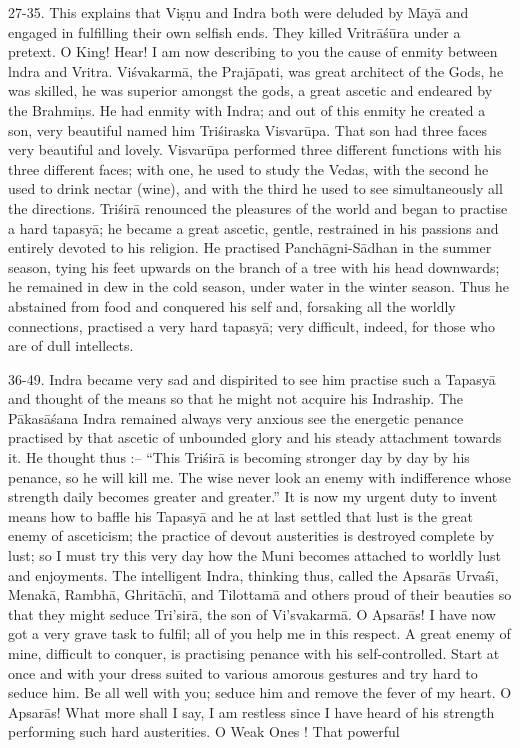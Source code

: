 27-35. This explains that Vi\d{s}\d{n}u and Indra both were deluded by M\=ay\=a and engaged in fulfilling their own selfish ends. They killed Vritr\=a\'s\=ura under a pretext. O King! Hear! I am now describing to you the cause of enmity between lndra and Vritra. Vi\'svakarm\=a, the Praj\=apati, was great architect of the Gods, he was skilled, he was superior amongst the gods, a great ascetic and endeared by the Brahmi\d{n}s. He had enmity with Indra; and out of this enmity he created a son, very beautiful named him Tri\'siraska Visvar\=upa. That son had three faces very beautiful and lovely. Visvar\=upa performed three different functions with his three different faces; with one, he used to study the Vedas, with the second he used to drink nectar (wine), and with the third he used to see simultaneously all the directions. Tri\'sir\=a renounced the pleasures of the world and began to practise a hard tapasy\=a; he became a great ascetic, gentle, restrained in his passions and entirely devoted to his religion. He practised Panch\=agni-S\=adhan in the summer season, tying his feet upwards on the branch of a tree with his head downwards; he remained in dew in the cold season, under water in the winter season. Thus he abstained from food and conquered his self and, forsaking all the worldly connections, practised a very hard tapasy\=a; very difficult, indeed, for those who are of dull intellects.

36-49. Indra became very sad and dispirited to see him practise such a Tapasy\=a and thought of the means so that he might not acquire his Indraship. The P\=akas\=a\'sana Indra remained always very anxious see the energetic penance practised by that ascetic of unbounded glory and his steady attachment towards it. He thought thus :-- ``This Tri\'sir\=a is becoming stronger day by day by his penance, so he will kill me. The wise never look an enemy with indifference whose strength daily becomes greater and greater.'' It is now my urgent duty to invent means how to baffle his Tapasy\=a and he at last settled that lust is the great enemy of asceticism; the practice of devout austerities is destroyed complete by lust; so I must try this very day how the Muni becomes attached to worldly lust and enjoyments. The intelligent Indra, thinking thus, called the Apsar\=as Urva\'s\={\i}, Menak\=a, Rambh\=a, Ghrit\=ach\={\i}, and Tilottam\=a and others proud of their beauties so that they might seduce Tri'sir\=a, the son of Vi'svakarm\=a. O Apsar\=as! I have now got a very grave task to fulfil; all of you help me in this respect. A great enemy of mine, difficult to conquer, is practising penance with his self-controlled. Start at once and with your dress suited to various amorous gestures and try hard to seduce him. Be all well with you; seduce him and remove the fever of my heart. O Apsar\=as! What more shall I say, I am restless since I have heard of his strength performing such hard austerities. O Weak Ones ! That powerful

